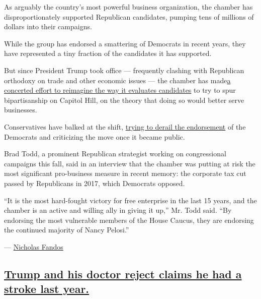 As arguably the country's most powerful business organization, the
chamber has disproportionately supported Republican candidates, pumping
tens of millions of dollars into their campaigns.

While the group has endorsed a smattering of Democrats in recent years,
they have represented a tiny fraction of the candidates it has
supported.

But since President Trump took office --- frequently clashing with
Republican orthodoxy on trade and other economic issues --- the chamber
has
made\href{https://slack-redir.net/link?url=https\%3A\%2F\%2Fwww.nytimes3xbfgragh.onion\%2F2019\%2F02\%2F02\%2Fus\%2Fpolitics\%2Fchamber-of-commerce-bipartisanship.html}{a
concerted effort to reimagine the way it evaluates candidates} to try to
spur bipartisanship on Capitol Hill, on the theory that doing so would
better serve businesses.

Conservatives have balked at the shift,
\href{https://slack-redir.net/link?url=https\%3A\%2F\%2Fwww.politico.com\%2Fnews\%2F2020\%2F08\%2F27\%2Fchamber-of-commerce-turmoil-402837}{trying
to derail the endorsement} of the Democrats and criticizing the move
once it became public.

Brad Todd, a prominent Republican strategist working on congressional
campaigns this fall, said in an interview that the chamber was putting
at risk the most significant pro-business measure in recent memory: the
corporate tax cut passed by Republicans in 2017, which Democrats
opposed.

``It is the most hard-fought victory for free enterprise in the last 15
years, and the chamber is an active and willing ally in giving it up,''
Mr. Todd said. ``By endorsing the most vulnerable members of the House
Caucus, they are endorsing the continued majority of Nancy Pelosi.''

---
\href{https://www.nytimes3xbfgragh.onion/by/nicholas-fandos}{Nicholas
Fandos}

\hypertarget{trump-and-his-doctor-reject-claims-he-had-a-stroke-last-year}{%
\subsection{\texorpdfstring{\protect\hyperlink{trump-and-his-doctor-reject-claims-he-had-a-stroke-last-year}{Trump
and his doctor reject claims he had a stroke last
year.}}{Trump and his doctor reject claims he had a stroke last year.}}\label{trump-and-his-doctor-reject-claims-he-had-a-stroke-last-year}}

